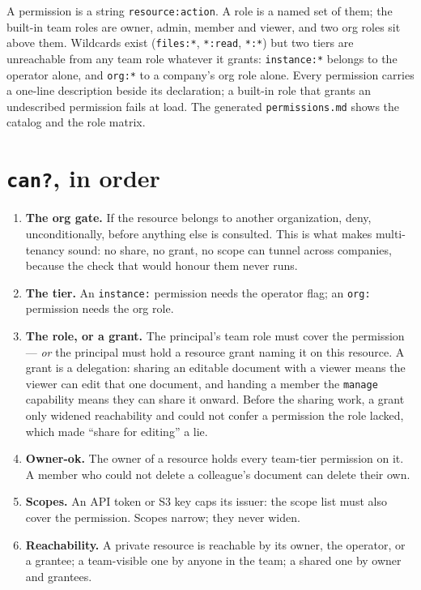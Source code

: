 \documentclass[11pt,a4paper]{report}
\begin{document}
A permission is a string \texttt{resource:action}. A role is a named set of them; the built-in team roles are owner, admin, member and viewer, and two org roles sit above them. Wildcards exist (\texttt{files:*}, \texttt{*:read}, \texttt{*:*}) but two tiers are unreachable from any team role whatever it grants: \texttt{instance:*} belongs to the operator alone, and \texttt{org:*} to a company's org role alone. Every permission carries a one-line description beside its declaration; a built-in role that grants an undescribed permission fails at load. The generated \texttt{permissions.md} shows the catalog and the role matrix.

\section{\texttt{can?}, in order}

\begin{enumerate}
\item \textbf{The org gate.} If the resource belongs to another organization, deny, unconditionally, before anything else is consulted. This is what makes multi-tenancy sound: no share, no grant, no scope can tunnel across companies, because the check that would honour them never runs.
\item \textbf{The tier.} An \texttt{instance:} permission needs the operator flag; an \texttt{org:} permission needs the org role.
\item \textbf{The role, or a grant.} The principal's team role must cover the permission --- \emph{or} the principal must hold a resource grant naming it on this resource. A grant is a delegation: sharing an editable document with a viewer means the viewer can edit that one document, and handing a member the \texttt{manage} capability means they can share it onward. Before the sharing work, a grant only widened reachability and could not confer a permission the role lacked, which made ``share for editing'' a lie.
\item \textbf{Owner-ok.} The owner of a resource holds every team-tier permission on it. A member who could not delete a colleague's document can delete their own.
\item \textbf{Scopes.} An API token or S3 key caps its issuer: the scope list must also cover the permission. Scopes narrow; they never widen.
\item \textbf{Reachability.} A private resource is reachable by its owner, the operator, or a grantee; a team-visible one by anyone in the team; a shared one by owner and grantees.
\end{enumerate}
\end{document}
